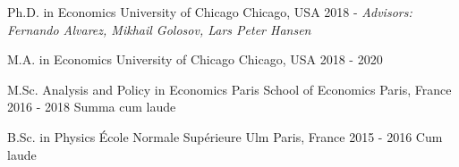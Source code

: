 

\begin{cventries}


    \cventry
    {Ph.D. in Economics} %
    {University of Chicago} %
    {Chicago, USA} %
    {2018 -} %
    {\emph{Advisors: Fernando Alvarez, Mikhail Golosov, Lars Peter Hansen}}

    \cventry
    {M.A. in Economics} %
    {University of Chicago} %
    {Chicago, USA} %
    {2018 - 2020} %
    {}

    \cventry
    {M.Sc. Analysis and Policy in Economics} %
    {Paris School of Economics} %
    {Paris, France} %
    {2016 - 2018} %
    {Summa cum laude}

    \cventry
    {B.Sc. in Physics} %
    {École Normale Supérieure Ulm} %
    {Paris, France} %
    {2015 - 2016} %
    {Cum laude}

\end{cventries}
